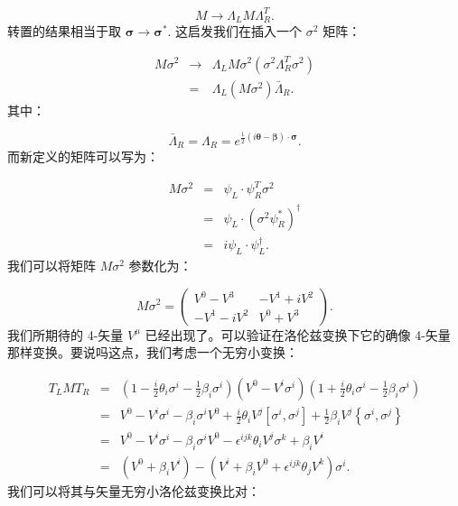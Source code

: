 \documentclass[10pt,UTF8]{ctexart}
\begin{document}
\begin{equation}
M\rightarrow\Lambda_{L}M\Lambda_{R}^{T}.
\end{equation}
转置的结果相当于取 $\bm{\sigma}\rightarrow\bm{\sigma}^{*}$. 这启发我们在插入一个 $\sigma^{2}$
矩阵：

\begin{eqnarray}
M\sigma^{2} & \rightarrow & \Lambda_{L}M\sigma^{2}\left(\sigma^{2}\Lambda_{R}^{T}\sigma^{2}\right)\nonumber \\
 & = & \Lambda_{L}\left(M\sigma^{2}\right)\bar{\Lambda}_{R}.
\end{eqnarray}
其中：

\begin{equation}
\bar{\Lambda}_{R}=\Lambda_{R}=e^{\frac{1}{2}\left(i\bm{\theta}-\bm{\beta}\right)\cdot\bm{\sigma}}.
\end{equation}
而新定义的矩阵可以写为：

\begin{eqnarray}
M\sigma^{2} & = & \psi_{L}\cdot\psi_{R}^{T}\sigma^{2}\nonumber \\
 & = & \psi_{L}\cdot\left(\sigma^{2}\psi_{R}^{*}\right)^{\dagger}\nonumber \\
 & = & i\psi_{L}\cdot\psi_{L}^{\dagger}.
\end{eqnarray}
我们可以将矩阵 $M\sigma^{2}$ 参数化为：

\begin{equation}
M\sigma^{2}=\left(\begin{array}{cc}
V^{0}-V^{3} & -V^{1}+iV^{2}\\
-V^{1}-iV^{2} & V^{0}+V^{3}
\end{array}\right).
\end{equation}
我们所期待的 4-矢量 $V^{\mu}$ 已经出现了。可以验证在洛伦兹变换下它的确像 4-矢量那样变换。要说吗这点，我们考虑一个无穷小变换：

\begin{eqnarray}
T_{L}MT_{R} & = & \left(1-\frac{i}{2}\theta_{i}\sigma^{i}-\frac{1}{2}\beta_{i}\sigma^{i}\right)\left(V^{0}-V^{i}\sigma^{i}\right)\left(1+\frac{i}{2}\theta_{i}\sigma^{i}-\frac{1}{2}\beta_{i}\sigma^{i}\right)\nonumber \\
 & = & V^{0}-V^{i}\sigma^{i}-\beta_{i}\sigma^{i}V^{0}+\frac{i}{2}\theta_{i}V^{j}\left[\sigma^{i},\sigma^{j}\right]+\frac{1}{2}\beta_{i}V^{j}\left\{ \sigma^{i},\sigma^{j}\right\} \nonumber \\
 & = & V^{0}-V^{i}\sigma^{i}-\beta_{i}\sigma^{i}V^{0}-\epsilon^{ijk}\theta_{i}V^{j}\sigma^{k}+\beta_{i}V^{i}\nonumber \\
 & = & \left(V^{0}+\beta_{i}V^{i}\right)-\left(V^{i}+\beta_{i}V^{0}+\epsilon^{ijk}\theta_{j}V^{k}\right)\sigma^{i}.
\end{eqnarray}
我们可以将其与矢量无穷小洛伦兹变换比对：
\end{document}
